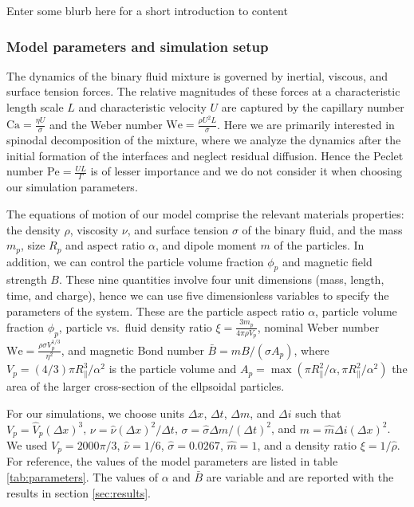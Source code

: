 Enter some blurb here for a short introduction to content

\subsubsection{Model parameters and simulation setup}\label{sec:parameters}

The dynamics of the binary fluid mixture is governed by inertial,
viscous, and surface tension forces. The relative magnitudes of these
forces at a characteristic length scale \(L\) and characteristic
velocity \(U\) are captured by the capillary number $\mathrm{Ca}=\frac{\eta U}{\sigma}$ and the Weber number
\(\mathrm{We}=\frac{\rho U^2 L}{\sigma}\). Here we are primarily interested in spinodal decomposition of the mixture, where we analyze the dynamics after the initial formation of the interfaces and neglect residual diffusion. Hence the Peclet number \(\mathrm{Pe}=\frac{UL}{\Gamma}\) is of lesser importance and we do not consider it when choosing our simulation parameters.

The equations of motion of our model comprise the relevant materials
properties: the density \(\rho\), viscosity \(\nu\), and surface tension \(\sigma\) of the binary fluid, and the mass \(m_p\), size \(R_p\) and aspect ratio \(\alpha\), and dipole moment \(m\) of the particles. In addition, we can control the particle volume fraction \(\phi_p\) and
magnetic field strength \(B\). These nine quantities involve four unit
dimensions (mass, length, time, and charge), hence we can use five
dimensionless variables to specify the parameters of the system. These
are the particle aspect ratio $\alpha$, particle volume fraction
\(\phi_p\), particle vs.~fluid density ratio
$\xi = \frac{3m_p}{4\pi \rho V_p}$, nominal Weber number $\mathrm{We} = \frac{\rho \sigma V_p^{1/3}}{\eta^2}$, and magnetic Bond
number \(\bar{B} = m B/(\sigma A_p)\), where
\(V_p=(4/3)\pi R_\parallel^3/\alpha^2\) is the particle volume and
\(A_p=\max\left( \pi R_\parallel^2/\alpha, \pi R_\parallel^2/\alpha^2 \right)\)
the area of the larger cross-section of the ellpsoidal particles.

For our simulations, we choose units \(\Delta x\), \(\Delta t\),
\(\Delta m\), and \(\Delta i\) such that \(V_p=\hat{V}_p(\Delta x)^3\),
\(\nu=\hat{\nu}(\Delta x)^2/\Delta t\),
\(\sigma=\hat{\sigma}\Delta m/(\Delta t)^2\), and
\(m=\hat{m}\Delta i(\Delta x)^2\). We used \(V_p=2000\pi/3\),
\(\hat{\nu}=1/6\), \(\hat{\sigma}=0.0267\), \(\hat{m}=1\), and a density
ratio \(\xi=1/\hat{\rho}\). For reference, the values of the model
parameters are listed in table \ref{tab:parameters}. The values of
\(\alpha\) and \(\bar{B}\) are variable and are reported
with the results in section \ref{sec:results}.

